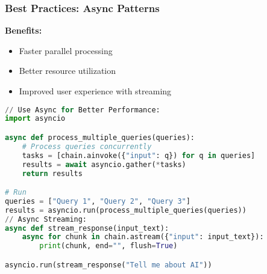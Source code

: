 \begin{frame}[fragile]\frametitle{Best Practices: Async Patterns}

\textbf{Benefits:}
\begin{itemize}
\item Faster parallel processing
\item Better resource utilization
\item Improved user experience with streaming
\end{itemize}


\begin{lstlisting}[language=python, basicstyle=\tiny]
// Use Async for Better Performance:
import asyncio

async def process_multiple_queries(queries):
    # Process queries concurrently
    tasks = [chain.ainvoke({"input": q}) for q in queries]
    results = await asyncio.gather(*tasks)
    return results

# Run
queries = ["Query 1", "Query 2", "Query 3"]
results = asyncio.run(process_multiple_queries(queries))
// Async Streaming:
async def stream_response(input_text):
    async for chunk in chain.astream({"input": input_text}):
        print(chunk, end="", flush=True)

asyncio.run(stream_response("Tell me about AI"))
\end{lstlisting}



\end{frame}
